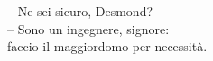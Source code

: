 \thispagestyle{empty}
\vspace{10cm}
\begin{flushright}
\small
-- Ne sei sicuro, Desmond?\\ 
\vspace{0.5em}
-- Sono un ingegnere, signore:\\ faccio il maggiordomo per necessità.
\end{flushright}